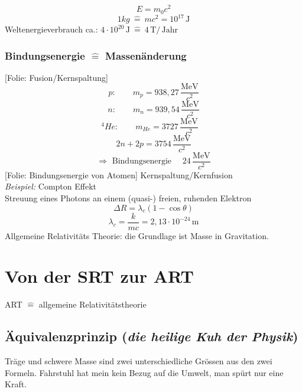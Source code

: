 \documentclass[titlepage,11pt,a4paper,ngerman]{report}
\newcommand{\tx}[1]{\textrm{#1}}
\newcommand{\folie}[1]{\color{gray}[Folie: #1]\color{black}}
\renewcommand{\vec}[1]{\boldsymbol{#1}}
\newcommand{\lcom}[1]{\color{MidnightBlue}#1\color{black}}
\begin{document}
\begin{equation*}
E = m_0 c^2 
\end{equation*}
\begin{equation*}
1 kg \ \widehat{=} \ m c^2 = 10^{17} \, \tx{J}
\end{equation*}
Weltenergieverbrauch ca.: $ 4 \cdot 10^{20} \, \tx{J} \ \widehat{=} \ 4 \, \tx{T} / \, \tx{Jahr} $
\subsubsection{Bindungsenergie $ \vec{\widehat{=}} $ Massenänderung}
\folie{Fusion/Kernspaltung}
\begin{equation*}
p: \qquad m_p = 938{,}27 \, \frac{\tx{MeV}}{c^2}
\end{equation*}
\begin{equation*}
n: \qquad m_n = 939{,}54 \, \frac{\tx{MeV}}{c^2}
\end{equation*}
\begin{equation*}
^4He: \qquad m_{He} = 3727 \, \frac{\tx{MeV}}{c^2} \ \ \ \;
\end{equation*}
\begin{equation*}
2n + 2p = 3754 \, \frac{\tx{MeV}}{c^2}
\end{equation*}
\begin{equation*}
\Rightarrow \tx{ Bindungsenergie } \quad 24 \, \frac{\tx{MeV}}{c^2}
\end{equation*}
\folie{Bindungsenergie von Atomen} Kernspaltung/Kernfusion\\[5pt]
\emph{Beispiel:} Compton Effekt\\
Streuung eines Photons an einem (quasi-) freien, ruhenden Elektron
\begin{equation*}
\Delta R = \lambda_c (1 - \cos \theta)
\end{equation*}
\begin{equation*}
\lambda_c = \frac{k}{mc} = 2{,}13 \cdot 10^{-24} \, \tx{m}
\end{equation*}
\lcom{Allgemeine Relativitäts Theorie: die Grundlage ist Masse in Gravitation.}
\section{Von der SRT zur ART}
ART $ \widehat{=} $ allgemeine Relativitätstheorie

\subsection{Äquivalenzprinzip (\emph{die heilige Kuh der Physik})}
\lcom{Träge und schwere Masse sind zwei unterschiedliche Grössen aus den zwei Formeln. Fahrstuhl hat mein kein Bezug auf die Umwelt, man spürt nur eine Kraft.}\\
\end{document}
